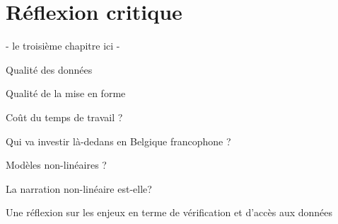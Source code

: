 
\chapter{Réflexion critique}

- le troisième chapitre ici -

Qualité des données

Qualité de la mise en forme

Coût du temps de travail ?

Qui va investir là-dedans en Belgique francophone ?

Modèles non-linéaires ?

La narration non-linéaire est-elle? 

Une réflexion sur les enjeux en terme de vérification et d'accès aux données
